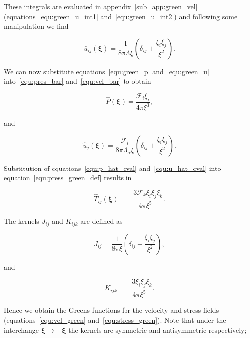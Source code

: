 \documentclass[12pt]{article}
\begin{document}
These integrals are evaluated in appendix~\ref{sub_app:green_vel} (equations~\ref{equ:green_u_int1} and~\ref{equ:green_u_int2}) and following some manipulation we find

\begin{equation}
\label{equ:green_u}
\bar{u}_{ij} (\boldsymbol\xi) = \frac{1}{8 \pi \Lambda \xi} \left(\delta_{ij} + \frac{\xi_{i} \xi_{j}}{\xi^{2}} \right).
\end{equation}

We can now substitute equations~\ref{equ:green_p} and~\ref{equ:green_u} into~\ref{equ:pres_bar} and~\ref{equ:vel_bar} to obtain

\begin{equation}
\label{equ:p_hat_eval}
\hat{P} (\boldsymbol\xi) = \frac{\mathcal{F}_{i} \xi_{i}}{4 \pi \xi^{3}},
\end{equation}

and 

\begin{equation}
\label{equ:u_hat_eval}
\hat{u}_{j}(\boldsymbol\xi) = \frac{\mathcal{F}_{i}}{8 \pi \Lambda_{\alpha} \xi} \left(\delta_{ij} + \frac{\xi_{i} \xi_{j}}{\xi^{2}} \right).
\end{equation}


Substitution of equations~\ref{equ:p_hat_eval} and~\ref{equ:u_hat_eval} into equation~\ref{equ:press_green_def} results in

\begin{equation}
\label{equ:green_stress}
\hat{T}_{ij} (\boldsymbol\xi) = \frac{-3 \mathcal{F}_{k} \xi_{i} \xi_{j} \xi_{k}}{4 \pi \xi^{5}}.
\end{equation}


The kernels $J_{ij}$ and $K_{ijk}$ are defined as

\begin{equation}
\label{equ:j_kernel}
J_{ij} = \frac{1}{8 \pi \xi} \left(\delta_{ij} + \frac{\xi_{i} \xi_{j}}{\xi^{2}} \right),
\end{equation}

and 

\begin{equation}
\label{equ:k_kernel}
K_{ijk} = \frac{-3 \xi_{i} \xi_{j} \xi_{k}}{4 \pi \xi^{5}}.
\end{equation}

Hence we obtain the Greens functions for the velocity and stress fields (equations~\ref{equ:vel_green} and~\ref{equ:stress_green}). Note that under the interchange $\boldsymbol\xi \to -\boldsymbol\xi$ the kernels are symmetric and antisymmetric respectively;
\end{document}
